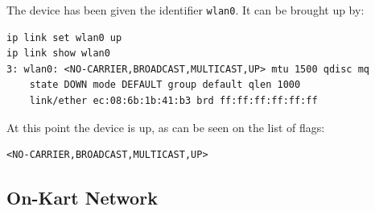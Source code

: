 The device has been given the identifier \texttt{wlan0}.
It can be brought up by:
\begin{lstlisting}
ip link set wlan0 up
ip link show wlan0
3: wlan0: <NO-CARRIER,BROADCAST,MULTICAST,UP> mtu 1500 qdisc mq 
	state DOWN mode DEFAULT group default qlen 1000
    link/ether ec:08:6b:1b:41:b3 brd ff:ff:ff:ff:ff:ff
\end{lstlisting}
At this point the device is up, as can be seen on the list of flags:
\begin{lstlisting}
<NO-CARRIER,BROADCAST,MULTICAST,UP>
\end{lstlisting}
\subsection{On-Kart Network}
